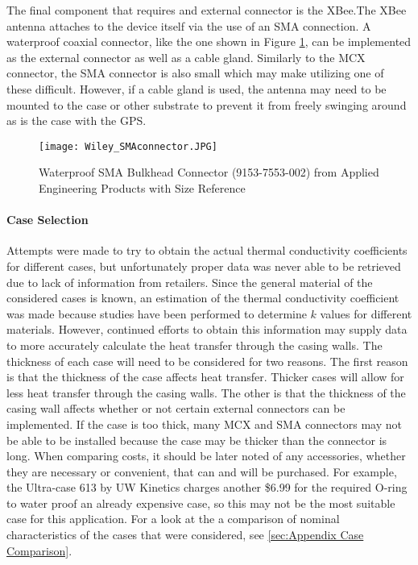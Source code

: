 The final component that requires and external connector is the XBee.The XBee antenna attaches to the device itself via the use of an SMA connection. A
waterproof coaxial connector, like the one shown in Figure \ref{fig:SMA}, can be implemented as the external connector as well as a cable gland. 
Similarly to the MCX connector, the SMA connector is also small which may make utilizing one of these difficult. However, if a cable gland is used, the
antenna may need to be mounted to the case or other substrate to prevent it from freely swinging around as is the case with the GPS.
\begin{figure}[ht]
\centering
\texttt{[image: Wiley\_SMAconnector.JPG]}
\caption{\label{fig:SMA} Waterproof SMA Bulkhead Connector (9153-7553-002) from Applied Engineering Products with Size Reference}
\end{figure}



\paragraph {Case Selection} Attempts were made to try to obtain the actual thermal conductivity coefficients for different cases, but unfortunately proper
data was never able to be retrieved due to lack of information from retailers. Since the general material of the considered cases is known, an
estimation of the thermal conductivity coefficient was made because studies have been performed to determine $k$ values for different materials. 
However, continued efforts to obtain this information may supply data to more accurately calculate the heat transfer through the casing walls. The
thickness of each case will need to be considered for two reasons. The first reason is that the thickness of the case affects heat transfer. Thicker
cases will allow for less heat transfer through the casing walls. The other is that the thickness of the casing wall affects whether or not certain
external connectors can be implemented. If the case is too thick, many MCX and SMA connectors may not be able to be installed because the case may
be thicker than the connector is long. When comparing costs, it should be later noted of any accessories, whether they are necessary or
convenient, that can and will be purchased. For example, the Ultra-case 613 by UW Kinetics charges another \$6.99 for the required O-ring to
water proof an already expensive case, so this may not be the most suitable case for this application. For a look at the a comparison of nominal
characteristics of the cases that were considered, see \ref{sec:Appendix Case Comparison}.


